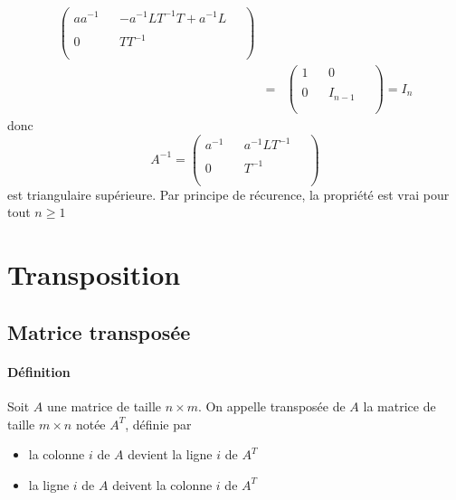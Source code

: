 \begin{enumerate}[(1)]
\begin{eqnarray*}
\begin{pmatrix}
        a a^{-1} &   & - a^{-1} L T^{-1} T + a^{-1} L & ~ \\
          &   &   & ~ \\
        0 &   & T T^{-1} & ~ \\
          &   &   & ~ \\
      \end{pmatrix}  \\ 
      &=&\begin{pmatrix}
        1 &   & 0 & ~ \\
          &   &   & ~ \\
        0 &   & I_{n-1} & ~ \\
          &   &   & ~ \\
      \end{pmatrix}
      = I_n
    \end{eqnarray*}
    donc
    $$A^{-1} = 
      \begin{pmatrix}
        a^{-1} &   & a^{-1} L T^{-1} & ~ \\
          &   &   &  ~  \\
        0 &   & T^{-1} & ~  \\
          &   &   &  ~ \\
      \end{pmatrix}$$
    est triangulaire supérieure. Par principe de récurence, la propriété est vrai pour tout $n \geq 1$
\end{enumerate} 
    

%
%
\section{Transposition}
%
%
%
\subsection{Matrice transposée}
%
\paragraph{Définition} Soit $A$ une matrice de taille $n\times m$. On appelle transposée de $A$ la matrice de taille $m\times n$ notée $A^T$, définie par
\begin{itemize}
  \item la colonne $i$ de $A$ devient la ligne $i$ de $A^T$
  \item la ligne $i$ de $A$ deivent la colonne $i$ de $A^T$
\end{itemize}

